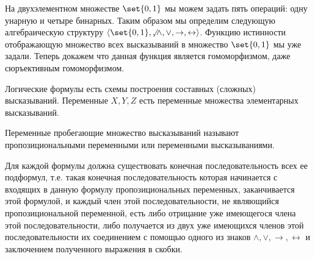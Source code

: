 На двухэлементном множестве $\set{0,1}$ мы можем задать пять операций: одну
унарную и четыре бинарных. Таким образом мы определим следующую алгебраическую
структуру $\left<\set{0,1}, \not, \land, \lor, \rightarrow,
\leftrightarrow\right>$. Функцию истинности отображающую множество всех
высказываний в множество $\set{0, 1}$ мы уже задали. Теперь докажем что данная
функция является гомоморфизмом, даже сюръективным гомоморфизмом.

Логические формулы есть схемы построения составных (сложных) высказываний.
Переменные $X,Y,Z$ есть переменные множества элементарных высказываний.

Переменные пробегающие множество высказываний называют пропозициональными
переменными или переменными высказываниями.

Для каждой формулы должна существовать конечная последовательность всех ее
подформул, т.е. такая конечная последовательность которая начинается с входящих
в данную формулу пропозициональных переменных, заканчивается этой формулой, и
каждый член этой последовательности, не являющийся пропозициональной переменной,
есть либо отрицание уже имеющегося члена этой последовательности, либо
получается из двух уже имеющихся членов этой последовательности их соединением с
помощью одного из знаков $\land,\lor,\rightarrow,\leftrightarrow$ и заключением
полученного выражения в скобки.

